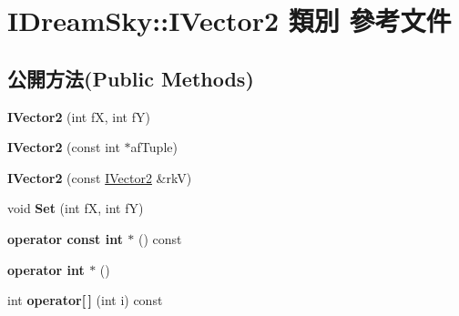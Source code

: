 \hypertarget{class_i_dream_sky_1_1_i_vector2}{}\section{I\+Dream\+Sky\+:\+:I\+Vector2 類別 參考文件}
\label{class_i_dream_sky_1_1_i_vector2}
\subsection*{公開方法(Public Methods)}
\begin{DoxyCompactItemize}
\item 
{\bfseries I\+Vector2} (int fX, int fY)\hypertarget{class_i_dream_sky_1_1_i_vector2_a6debaed533ef943026b1d5be0940b0ec}{}\label{class_i_dream_sky_1_1_i_vector2_a6debaed533ef943026b1d5be0940b0ec}

\item 
{\bfseries I\+Vector2} (const int $\ast$af\+Tuple)\hypertarget{class_i_dream_sky_1_1_i_vector2_a19343b1ef8fecb8b15e6b6491718997d}{}\label{class_i_dream_sky_1_1_i_vector2_a19343b1ef8fecb8b15e6b6491718997d}

\item 
{\bfseries I\+Vector2} (const \hyperlink{class_i_dream_sky_1_1_i_vector2}{I\+Vector2} \&rkV)\hypertarget{class_i_dream_sky_1_1_i_vector2_a6cd31b7a563ee01db5ec1e7539147fc9}{}\label{class_i_dream_sky_1_1_i_vector2_a6cd31b7a563ee01db5ec1e7539147fc9}

\item 
void {\bfseries Set} (int fX, int fY)\hypertarget{class_i_dream_sky_1_1_i_vector2_a915c44d87fd1ba082a711ab7b05d419c}{}\label{class_i_dream_sky_1_1_i_vector2_a915c44d87fd1ba082a711ab7b05d419c}

\item 
{\bfseries operator const int $\ast$} () const \hypertarget{class_i_dream_sky_1_1_i_vector2_ad059c7bee8ef5503b2fbd49adb703aab}{}\label{class_i_dream_sky_1_1_i_vector2_ad059c7bee8ef5503b2fbd49adb703aab}

\item 
{\bfseries operator int $\ast$} ()\hypertarget{class_i_dream_sky_1_1_i_vector2_a5b71e5aecd81352ce4f9f50b16f48a41}{}\label{class_i_dream_sky_1_1_i_vector2_a5b71e5aecd81352ce4f9f50b16f48a41}

\item 
int {\bfseries operator\mbox{[}$\,$\mbox{]}} (int i) const \hypertarget{class_i_dream_sky_1_1_i_vector2_a921d440417c767dd2b288d6442e97524}{}\label{class_i_dream_sky_1_1_i_vector2_a921d440417c767dd2b288d6442e97524}


\end{DoxyCompactItemize}
